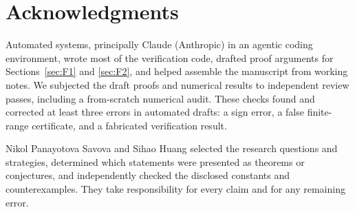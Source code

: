 \documentclass[11pt]{amsart}
\theoremstyle{plain}
\theoremstyle{definition}
\theoremstyle{remark}
\begin{document}
\section*{Acknowledgments}

Automated systems, principally Claude (Anthropic) in an agentic coding
environment, wrote most of the verification code, drafted proof arguments
for Sections~\ref{sec:F1} and \ref{sec:F2}, and helped assemble the
manuscript from working notes. We subjected the draft proofs and numerical
results to independent review passes, including a from-scratch numerical
audit. These checks found and corrected at least three errors in automated
drafts: a sign error, a false finite-range certificate, and a fabricated
verification result.

Nikol Panayotova Savova and Sihao Huang selected the research questions and
strategies, determined which statements were presented as theorems or
conjectures, and independently checked the disclosed constants and
counterexamples. They take responsibility for every claim and for any
remaining error.

\end{document}
